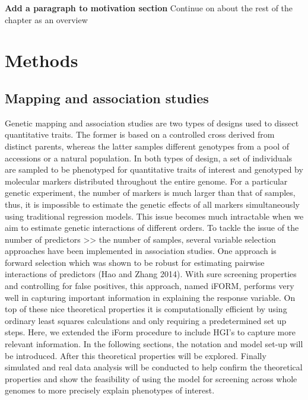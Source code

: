 \documentclass[11pt,]{book}
\theoremstyle{definition}
\theoremstyle{definition}
\theoremstyle{remark}
\begin{document}
\textbf{Add a paragraph to motivation section} Continue on about the
rest of the chapter as an overview

\section{Methods}\label{methods-1}

\subsection{Mapping and association
studies}\label{mapping-and-association-studies}

Genetic mapping and association studies are two types of designs used to
dissect quantitative traits. The former is based on a controlled cross
derived from distinct parents, whereas the latter samples different
genotypes from a pool of accessions or a natural population. In both
types of design, a set of individuals are sampled to be phenotyped for
quantitative traits of interest and genotyped by molecular markers
distributed throughout the entire genome. For a particular genetic
experiment, the number of markers is much larger than that of samples,
thus, it is impossible to estimate the genetic effects of all markers
simultaneously using traditional regression models. This issue becomes
much intractable when we aim to estimate genetic interactions of
different orders. To tackle the issue of the number of predictors
\textgreater{}\textgreater{} the number of samples, several variable
selection approaches have been implemented in association studies. One
approach is forward selection which was shown to be robust for
estimating pairwise interactions of predictors (Hao and Zhang 2014).
With sure screening properties and controlling for false positives, this
approach, named iFORM, performs very well in capturing important
information in explaining the response variable. On top of these nice
theoretical properties it is computationally efficient by using ordinary
least squares calculations and only requiring a predetermined set up
steps. Here, we extended the iForm procedure to include HGI's to capture
more relevant information. In the following sections, the notation and
model set-up will be introduced. After this theoretical properties will
be explored. Finally simulated and real data analysis will be conducted
to help confirm the theoretical properties and show the feasibility of
using the model for screening across whole genomes to more precisely
explain phenotypes of interest.
\end{document}
